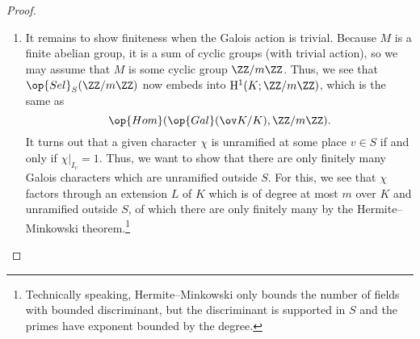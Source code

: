 \documentclass[../notes.tex]{subfiles}
\begin{document}
\begin{proof}
\begin{enumerate}
		\item It remains to show finiteness when the Galois action is trivial. Because $M$ is a finite abelian group, it is a sum of cyclic groups (with trivial action), so we may assume that $M$ is some cyclic group $\ZZ/m\ZZ$. Thus, we see that $\op{Sel}_S(\ZZ/m\ZZ)$ now embeds into $\mathrm H^1(K;\ZZ/m\ZZ)$, which is the same as
		\[\op{Hom}(\op{Gal}(\ov K/K),\ZZ/m\ZZ).\]
		It turns out that a given character $\chi$ is unramified at some place $v\in S$ if and only if $\chi|_{I_v}=1$. Thus, we want to show that there are only finitely many Galois characters which are unramified outside $S$. For this, we see that $\chi$ factors through an extension $L$ of $K$ which is of degree at most $m$ over $K$ and unramified outside $S$, of which there are only finitely many by the Hermite--Minkowski theorem.\footnote{Technically speaking, Hermite--Minkowski only bounds the number of fields with bounded discriminant, but the discriminant is supported in $S$ and the primes have exponent bounded by the degree.}
		\qedhere
	\end{enumerate}
\end{proof}
\end{document}
